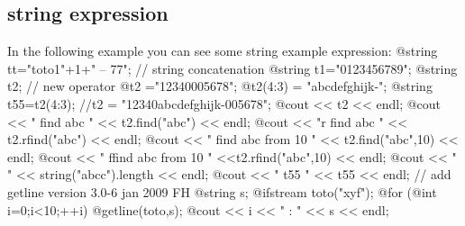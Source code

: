 \documentclass[a4paper,twoside,12pt]{book}
\begin{document}
\subsection{string expression}
In the following example you can see some  string example expression:
\bFF
@string tt="toto1"+1+" -- 77"; // string concatenation   
@string t1="0123456789";
@string t2;
// new operator
@t2 ="12340005678";
@t2(4:3) = "abcdefghijk-"; 
@string t55=t2(4:3);
//t2 = "12340abcdefghijk-005678";
@cout << t2 << endl;
@cout << "  find abc " << t2.find("abc") << endl;
@cout << "r find abc " << t2.rfind("abc") << endl;
@cout << " find abc from 10  " << t2.find("abc",10) << endl;
@cout << " ffind abc from 10 " <<t2.rfind("abc",10) << endl;
@cout << "   " << string("abcc").length << endl; 
@cout << " t55 " << t55 << endl;
{  // add getline version 3.0-6 jan 2009 FH
@string s;
@ifstream toto("xyf");
@for (@int i=0;i<10;++i)
  {
   @getline(toto,s);
   @cout << i << " : " << s << endl;
  }
}
\eFF
\end{document}
